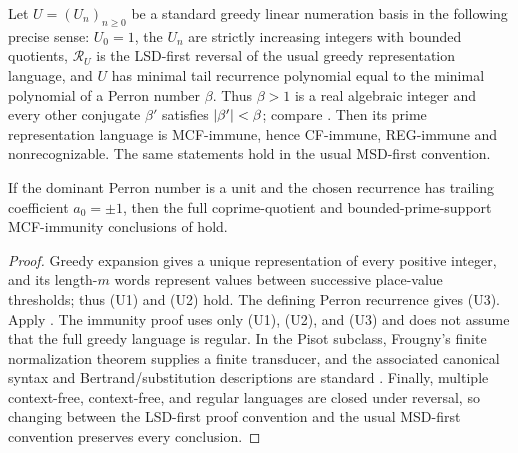 \begin{corollary}
  \label{cor:linear-perron-prime-cf-immunity}
  Let \(U=(U_n)_{n\ge0}\) be a standard greedy linear numeration basis in
  the following precise sense: \(U_0=1\), the \(U_n\) are strictly
  increasing integers with bounded quotients, \(\mathcal R_U\) is the LSD-first
  reversal of the usual greedy representation language, and \(U\)
  has minimal tail recurrence polynomial equal to the minimal polynomial
  of a Perron number \(\beta\). Thus
  \(\beta>1\) is a real algebraic integer and every other conjugate
  \(\beta'\) satisfies \(\lvert \beta' \rvert<\beta\); compare
  \cite{LindMarcus1995,Rigo2014Vol2}. Then its prime
  representation language is MCF-immune, hence CF-immune, REG-immune and
  nonrecognizable. The same statements hold in the usual MSD-first
  convention.

  If the dominant Perron number is a unit and the chosen recurrence has
  trailing coefficient \(a_0=\pm1\), then the full coprime-quotient and
  bounded-prime-support MCF-immunity conclusions of
   hold.
\end{corollary}

\begin{proof}
  Greedy expansion gives a unique representation of every positive
  integer, and its length-\(m\) words represent values between successive
  place-value thresholds; thus \textup{(U1)} and \textup{(U2)} hold. The defining
  Perron recurrence gives \textup{(U3)}. Apply
  . The immunity proof
  uses only \textup{(U1)}, \textup{(U2)}, and \textup{(U3)} and does not
  assume that the full greedy language is regular. In the Pisot subclass,
  Frougny's finite
  normalization theorem supplies a finite transducer, and the associated
  canonical syntax and Bertrand/substitution descriptions are standard
  \cite{Frougny1992,BruyereHansel1997,Fabre1995,FrougnySolomyak1992}.
  Finally, multiple context-free, context-free, and
  regular languages are closed under reversal, so changing between the LSD-first proof
  convention and the usual MSD-first convention preserves every
  conclusion.
\end{proof}

